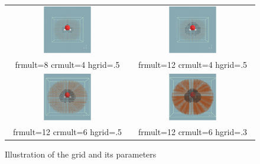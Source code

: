 \documentclass[a4paper,11pt]{report}
\begin{document}
\begin{figure}[ht]             %
\begin{center}
\begin{tabular}{cc}
\includegraphics[width=0.4\textwidth]{grid100.pdf} &
\includegraphics[width=0.4\textwidth]{grid200.pdf} \\
frmult=8 crmult=4 hgrid=.5 & frmult=12 crmult=4 hgrid=.5 \\
\includegraphics[width=0.4\textwidth]{grid300.pdf} &
\includegraphics[width=0.4\textwidth]{grid400.pdf} \\
frmult=12 crmult=6 hgrid=.5 & frmult=12 crmult=6 hgrid=.3
\end{tabular}
\end{center}
\label{grids}
\caption{Illustration of the grid and its parameters}
\end{figure}
\end{document}
